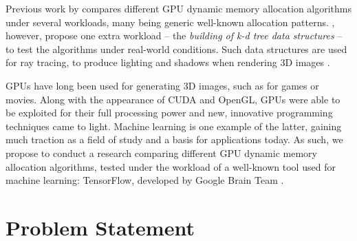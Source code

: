 \documentclass[12pt,twoside]{article}
\begin{document}


Previous work by \citeauthor{Vinkler2015} \cite{Vinkler2015} compares different GPU dynamic memory allocation algorithms under several workloads, many being generic well-known allocation patterns. \citeauthor{Vinkler2015}, however, propose one extra workload -- the \textit{building of k-d tree data structures} -- to test the algorithms under real-world conditions. Such data structures are used for ray tracing, to produce lighting and shadows when rendering 3D images \cite{Wald_Havran_2006} \cite{Rademacher_1997}.

GPUs have long been used for generating 3D images, such as for games or movies. Along with the appearance of CUDA and OpenGL, GPUs were able to be exploited for their full processing power and new, innovative programming techniques came to light. Machine learning is one example of the latter, gaining much traction as a field of study and a basis for applications today. As such, we propose to conduct a research comparing different GPU dynamic memory allocation algorithms, tested under the workload of a well-known tool used for machine learning: TensorFlow, developed by Google Brain Team \cite{abadi2016}.

\section{Problem Statement}
\label{sec:problem-statement}
\end{document}
